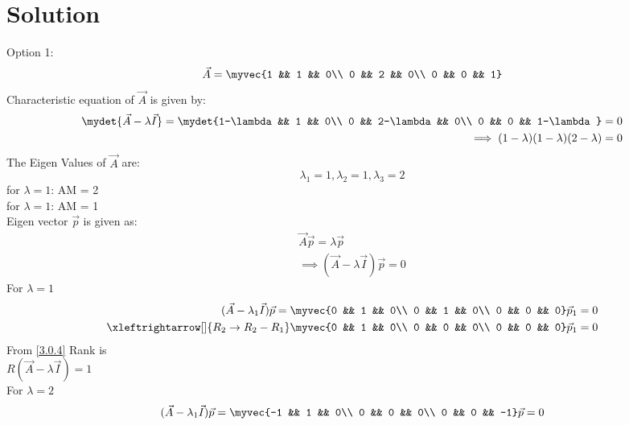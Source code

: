 \documentclass[journal,12pt,twocolumn]{IEEEtran}
\begin{document}
\section{Solution}
Option 1:
\begin{equation*}
\vec{A} = \myvec{1 && 1 && 0\\ 0 && 2 && 0\\ 0 && 0 && 1}
\end{equation*}
Characteristic equation of $\vec{A}$ is given by:
\begin{equation} \label{3.0.1}
\begin{split}
\mydet{\vec{A}-\lambda \vec{I}}=\mydet{1-\lambda && 1 && 0\\ 0 && 2-\lambda && 0\\ 0 && 0 && 1-\lambda} = 0\\
\implies (1-\lambda)(1-\lambda)(2-\lambda) = 0
\end{split}
\end{equation}
The Eigen Values of $\vec{A}$ are:
\begin{equation} \label{3.0.2}
\lambda_1 = 1, \lambda_2 = 1, \lambda_3 = 2
\end{equation}
for $\lambda = 1$: AM = 2\\
for $\lambda = 1$: AM = 1\\
Eigen vector $\vec{p}$ is given as:
\begin{equation} \label{3.0.3}
\begin{split}
\vec{A}\vec{p} = \lambda\vec{p}\\
\implies (\vec{A} - \lambda \vec{I})\vec{p} = 0
\end{split}
\end{equation}
For $\lambda = 1$
\begin{equation}\label{3.0.4}
\begin{split}
(\vec{A} - \lambda_1 \vec{I})\vec{p} = \myvec{0 && 1 && 0\\ 0 && 1 && 0\\ 0 && 0 && 0}\vec{p}_1 = 0\\ 
\xleftrightarrow[]{R_2\rightarrow R_2-R_1}
\myvec{0 && 1 && 0\\ 0 && 0 && 0\\ 0 && 0 && 0}\vec{p}_1 = 0
\end{split}
\end{equation}
From \eqref{3.0.4} Rank is\\
$R(\vec{A} - \lambda \vec{I}) = 1$\\
For $\lambda = 2$
\begin{equation}\label{3.0.5}
(\vec{A} - \lambda_1 \vec{I})\vec{p} = \myvec{-1 && 1 && 0\\ 0 && 0 && 0\\ 0 && 0 && -1}\vec{p} = 0
\end{equation}
\end{document}
